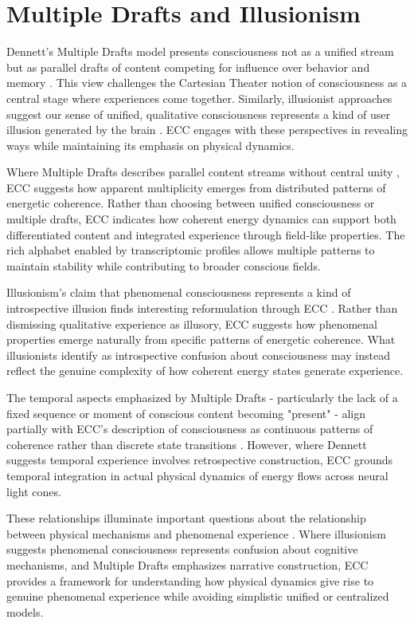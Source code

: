 \section{Multiple Drafts and Illusionism}

Dennett's Multiple Drafts model presents consciousness not as a unified stream but as parallel drafts of content competing for influence over behavior and memory \cite{Dennett1991}. This view challenges the Cartesian Theater notion of consciousness as a central stage where experiences come together. Similarly, illusionist approaches suggest our sense of unified, qualitative consciousness represents a kind of user illusion generated by the brain \cite{Dennett2016}. ECC engages with these perspectives in revealing ways while maintaining its emphasis on physical dynamics.

Where Multiple Drafts describes parallel content streams without central unity \cite{Dennett1992}, ECC suggests how apparent multiplicity emerges from distributed patterns of energetic coherence. Rather than choosing between unified consciousness or multiple drafts, ECC indicates how coherent energy dynamics can support both differentiated content and integrated experience through field-like properties. The rich alphabet enabled by transcriptomic profiles allows multiple patterns to maintain stability while contributing to broader conscious fields.

Illusionism's claim that phenomenal consciousness represents a kind of introspective illusion finds interesting reformulation through ECC \cite{Frankish2016}. Rather than dismissing qualitative experience as illusory, ECC suggests how phenomenal properties emerge naturally from specific patterns of energetic coherence. What illusionists identify as introspective confusion about consciousness may instead reflect the genuine complexity of how coherent energy states generate experience.

The temporal aspects emphasized by Multiple Drafts - particularly the lack of a fixed sequence or moment of conscious content becoming "present" - align partially with ECC's description of consciousness as continuous patterns of coherence rather than discrete state transitions \cite{Blackmore2002}. However, where Dennett suggests temporal experience involves retrospective construction, ECC grounds temporal integration in actual physical dynamics of energy flows across neural light cones.

These relationships illuminate important questions about the relationship between physical mechanisms and phenomenal experience \cite{Pereboom2011}. Where illusionism suggests phenomenal consciousness represents confusion about cognitive mechanisms, and Multiple Drafts emphasizes narrative construction, ECC provides a framework for understanding how physical dynamics give rise to genuine phenomenal experience while avoiding simplistic unified or centralized models.


